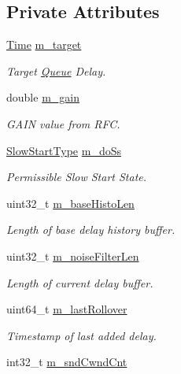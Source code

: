 \subsection*{Private Attributes}
\begin{DoxyCompactItemize}
\item 
\hyperlink{classns3_1_1Time}{Time} \hyperlink{classns3_1_1TcpLedbat_a93ab2886c4bbbcec5a6efd192c437fb7}{m\+\_\+target}
\begin{DoxyCompactList}\small\item\em Target \hyperlink{classns3_1_1Queue}{Queue} Delay. \end{DoxyCompactList}\item 
double \hyperlink{classns3_1_1TcpLedbat_a41255ef3e04f7cc54c4634c3729da506}{m\+\_\+gain}
\begin{DoxyCompactList}\small\item\em G\+A\+IN value from R\+FC. \end{DoxyCompactList}\item 
\hyperlink{classns3_1_1TcpLedbat_a7099bb59b406b311fab27960df7c8620}{Slow\+Start\+Type} \hyperlink{classns3_1_1TcpLedbat_a0514fe7772b42629f333f96e636d9a8d}{m\+\_\+do\+Ss}
\begin{DoxyCompactList}\small\item\em Permissible Slow Start State. \end{DoxyCompactList}\item 
uint32\+\_\+t \hyperlink{classns3_1_1TcpLedbat_ab72482ecda86d4f7f54c75dfeaa39eb2}{m\+\_\+base\+Histo\+Len}
\begin{DoxyCompactList}\small\item\em Length of base delay history buffer. \end{DoxyCompactList}\item 
uint32\+\_\+t \hyperlink{classns3_1_1TcpLedbat_abbc074450211a63831a0bf5313252310}{m\+\_\+noise\+Filter\+Len}
\begin{DoxyCompactList}\small\item\em Length of current delay buffer. \end{DoxyCompactList}\item 
uint64\+\_\+t \hyperlink{classns3_1_1TcpLedbat_acb19a27ad644fa5d72098330e1c55686}{m\+\_\+last\+Rollover}
\begin{DoxyCompactList}\small\item\em Timestamp of last added delay. \end{DoxyCompactList}\item 
int32\+\_\+t \hyperlink{classns3_1_1TcpLedbat_aad785b326c9667e16056ef4f23c12299}{m\+\_\+snd\+Cwnd\+Cnt}

\end{DoxyCompactItemize}
